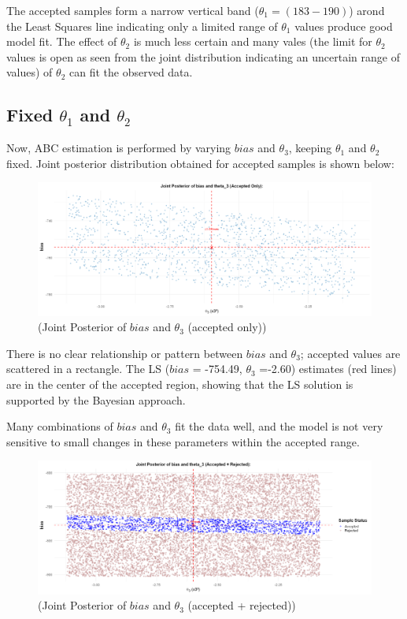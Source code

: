 \documentclass[12pt,a4paper]{article}
\begin{document}
The accepted samples form a narrow vertical band ($\theta_1 = (183 - 190)$)
arond the Least Squares line indicating only a 
limited range of $\theta_1$ values produce good model 
fit. The effect of $\theta_2$ is much less certain and many 
vales (the limit for $\theta_2$ values is open as seen from the joint 
distribution indicating an uncertain range of values) of $\theta_2$ can 
fit the observed data. 

\subsection*{Fixed $\theta_1$ and $\theta_2$}

Now, ABC estimation is performed by varying $bias$ and $\theta_3$, 
keeping $\theta_1$ and $\theta_2$ fixed. Joint posterior distribution obtained 
for accepted samples is shown below: 

\begin{figure}[H]
  \centering
  \includegraphics[width=\textwidth]{m10.png}
  \caption{(Joint Posterior of $bias$ and $\theta_3$ (accepted only))}
  \label{fig:Joint Posterior of $bias$ and $\theta_3$}
\end{figure}

There is no clear relationship or pattern between $bias$ 
and $\theta_3$; accepted values are scattered in a rectangle.  
The LS ($bias$ = -754.49, $\theta_3$ =-2.60) estimates 
(red lines) are in the center of the accepted region, 
showing that the LS solution is supported by the Bayesian approach.  

Many combinations of $bias$ and $\theta_3$ fit the 
data well, and the model is not very sensitive to 
small changes in these parameters within the accepted range.

\begin{figure}[H]
  \centering
  \includegraphics[width=\textwidth]{m11.png}
  \caption{(Joint Posterior of $bias$ and $\theta_3$ (accepted + rejected))}
  \label{fig:Joint Posterior of $bias$ and $\theta_3$}
\end{figure}
\end{document}

